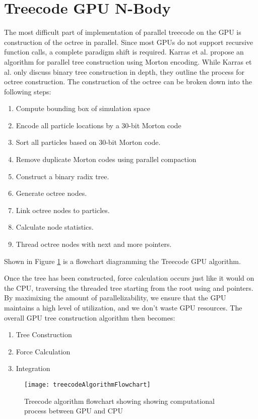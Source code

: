 \documentclass{thesis}
\begin{document}
\section{Treecode GPU N-Body}
The most difficult part of implementation of parallel treecode on the GPU is construction of the octree in parallel. Since most GPUs do not support recursive function calls, a complete paradigm shift is required. Karras et al. propose an algorithm for parallel tree construction using Morton encoding. While Karras et al. only discuss binary tree construction in depth, they outline the process for octree construction. The construction of the octree can be broken down into the following steps:
\begin{enumerate}[noitemsep]
    \item Compute bounding box of simulation space
    \item Encode all particle locations by a 30-bit Morton code
    \item Sort all particles based on 30-bit Morton code.
    \item Remove duplicate Morton codes using parallel compaction
    \item Construct a binary radix tree.
    \item Generate octree nodes.
    \item Link octree nodes to particles.
    \item Calculate node statistics.
    \item Thread octree nodes with next and more pointers.
\end{enumerate}
Shown in Figure \ref{fig:GPUTreecodeAlg} is a flowchart diagramming the Treecode GPU algorithm.

Once the tree has been constructed, force calculation occurs just like it would on the CPU, traversing the threaded tree starting from the root using  and  pointers. By maximixing the amount of parallelizability, we ensure that the GPU maintains a high level of utilization, and we don't waste GPU resources. The overall GPU tree construction algorithm then becomes:
\begin{enumerate}[noitemsep]
    \item Tree Construction
    \item Force Calculation
    \item Integration
\end{enumerate}
\begin{figure}[h]
    \caption{Treecode algorithm flowchart showing showing computational process between GPU and CPU}
    \label{fig:GPUTreecodeAlg}
    \centering
    \texttt{[image: treecodeAlgorithmFlowchart]}
\end{figure}
\end{document}
